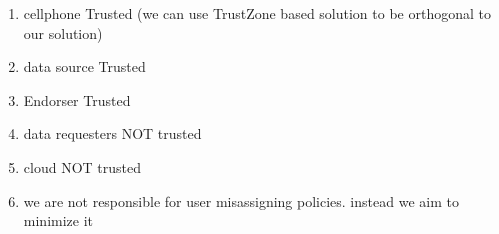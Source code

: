 \begin{enumerate}
	\item cellphone Trusted (we can use TrustZone based solution to be orthogonal to our solution)

	\item data source Trusted

	\item Endorser Trusted

	\item data requesters NOT trusted

	\item cloud NOT trusted

	\item we are not responsible for user misassigning policies. instead we aim to minimize it

\end{enumerate}
